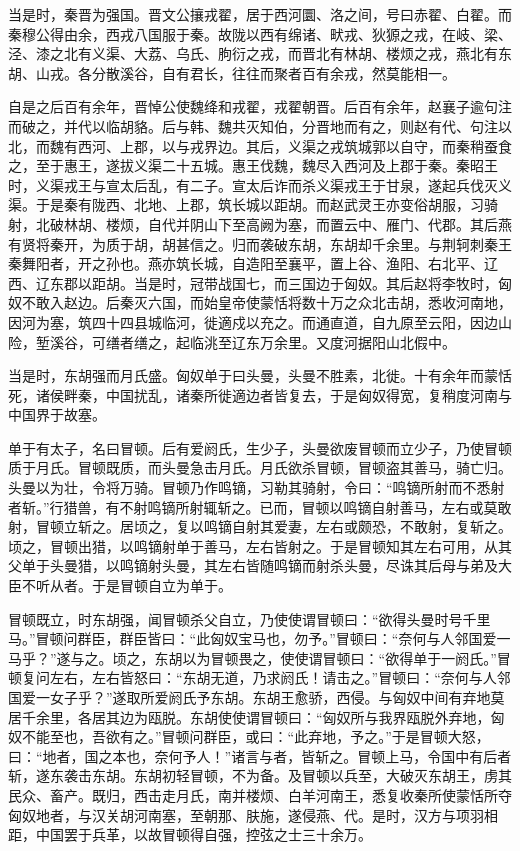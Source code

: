 \documentclass[]{article}
\begin{document}
当是时，秦晋为强国。晋文公攘戎翟，居于西河圜、洛之间，号曰赤翟、白翟。而秦穆公得由余，西戎八国服于秦。故陇以西有绵诸、畎戎、狄獂之戎，在岐、梁、泾、漆之北有义渠、大荔、乌氏、朐衍之戎，而晋北有林胡、楼烦之戎，燕北有东胡、山戎。各分散溪谷，自有君长，往往而聚者百有余戎，然莫能相一。

自是之后百有余年，晋悼公使魏绛和戎翟，戎翟朝晋。后百有余年，赵襄子逾句注而破之，并代以临胡貉。后与韩、魏共灭知伯，分晋地而有之，则赵有代、句注以北，而魏有西河、上郡，以与戎界边。其后，义渠之戎筑城郭以自守，而秦稍蚕食之，至于惠王，遂拔义渠二十五城。惠王伐魏，魏尽入西河及上郡于秦。秦昭王时，义渠戎王与宣太后乱，有二子。宣太后诈而杀义渠戎王于甘泉，遂起兵伐灭义渠。于是秦有陇西、北地、上郡，筑长城以距胡。而赵武灵王亦变俗胡服，习骑射，北破林胡、楼烦，自代并阴山下至高阙为塞，而置云中、雁门、代郡。其后燕有贤将秦开，为质于胡，胡甚信之。归而袭破东胡，东胡却千余里。与荆轲刺秦王秦舞阳者，开之孙也。燕亦筑长城，自造阳至襄平，置上谷、渔阳、右北平、辽西、辽东郡以距胡。当是时，冠带战国七，而三国边于匈奴。其后赵将李牧时，匈奴不敢入赵边。后秦灭六国，而始皇帝使蒙恬将数十万之众北击胡，悉收河南地，因河为塞，筑四十四县城临河，徙適戍以充之。而通直道，自九原至云阳，因边山险，堑溪谷，可缮者缮之，起临洮至辽东万余里。又度河据阳山北假中。

当是时，东胡强而月氏盛。匈奴单于曰头曼，头曼不胜素，北徙。十有余年而蒙恬死，诸侯畔秦，中国扰乱，诸秦所徙適边者皆复去，于是匈奴得宽，复稍度河南与中国界于故塞。

单于有太子，名曰冒顿。后有爱阏氏，生少子，头曼欲废冒顿而立少子，乃使冒顿质于月氏。冒顿既质，而头曼急击月氏。月氏欲杀冒顿，冒顿盗其善马，骑亡归。头曼以为壮，令将万骑。冒顿乃作鸣镝，习勒其骑射，令曰：``鸣镝所射而不悉射者斩。''行猎兽，有不射鸣镝所射辄斩之。已而，冒顿以鸣镝自射善马，左右或莫敢射，冒顿立斩之。居顷之，复以鸣镝自射其爱妻，左右或颇恐，不敢射，复斩之。顷之，冒顿出猎，以鸣镝射单于善马，左右皆射之。于是冒顿知其左右可用，从其父单于头曼猎，以鸣镝射头曼，其左右皆随鸣镝而射杀头曼，尽诛其后母与弟及大臣不听从者。于是冒顿自立为单于。

冒顿既立，时东胡强，闻冒顿杀父自立，乃使使谓冒顿曰：``欲得头曼时号千里马。''冒顿问群臣，群臣皆曰：``此匈奴宝马也，勿予。''冒顿曰：``奈何与人邻国爱一马乎？''遂与之。顷之，东胡以为冒顿畏之，使使谓冒顿曰：``欲得单于一阏氏。''冒顿复问左右，左右皆怒曰：``东胡无道，乃求阏氏！请击之。''冒顿曰：``奈何与人邻国爱一女子乎？''遂取所爱阏氏予东胡。东胡王愈骄，西侵。与匈奴中间有弃地莫居千余里，各居其边为瓯脱。东胡使使谓冒顿曰：``匈奴所与我界瓯脱外弃地，匈奴不能至也，吾欲有之。''冒顿问群臣，或曰：``此弃地，予之。''于是冒顿大怒，曰：``地者，国之本也，奈何予人！''诸言与者，皆斩之。冒顿上马，令国中有后者斩，遂东袭击东胡。东胡初轻冒顿，不为备。及冒顿以兵至，大破灭东胡王，虏其民众、畜产。既归，西击走月氏，南并楼烦、白羊河南王，悉复收秦所使蒙恬所夺匈奴地者，与汉关胡河南塞，至朝那、肤施，遂侵燕、代。是时，汉方与项羽相距，中国罢于兵革，以故冒顿得自强，控弦之士三十余万。
\end{document}
